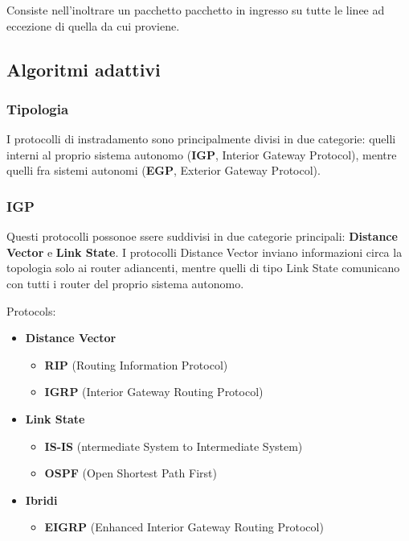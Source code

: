 \documentclass[a4paper]{article}
\begin{document}
Consiste nell'inoltrare un pacchetto pacchetto in ingresso su
tutte le linee ad eccezione di quella da cui proviene.

\subsection{Algoritmi adattivi}

\subsubsection{Tipologia}

I protocolli di instradamento sono principalmente
divisi in due categorie: quelli interni al proprio
sistema autonomo (\textbf{IGP}, Interior Gateway Protocol),
mentre quelli fra sistemi autonomi (\textbf{EGP}, Exterior Gateway Protocol).

\subsubsection{IGP}

Questi protocolli possonoe ssere suddivisi in due categorie principali:
\textbf{Distance Vector} e \textbf{Link State}.
I protocolli Distance Vector inviano informazioni circa la topologia solo ai router adiancenti,
mentre quelli di tipo Link State comunicano con tutti i router del proprio sistema autonomo.

\pagebreak

Protocols:

\begin{itemize}
    \item \textbf{Distance Vector}
    \begin{itemize}
        \item \textbf{RIP} (Routing Information Protocol)
        \item \textbf{IGRP} (Interior Gateway Routing Protocol)
    \end{itemize}

    \item \textbf{Link State}
    \begin{itemize}
        \item \textbf{IS-IS} (ntermediate System to Intermediate System)
        \item \textbf{OSPF} (Open Shortest Path First)
    \end{itemize}

    \item \textbf{Ibridi}
    \begin{itemize}
        \item \textbf{EIGRP} (Enhanced Interior Gateway Routing Protocol)
    \end{itemize}
\end{itemize}
\end{document}
